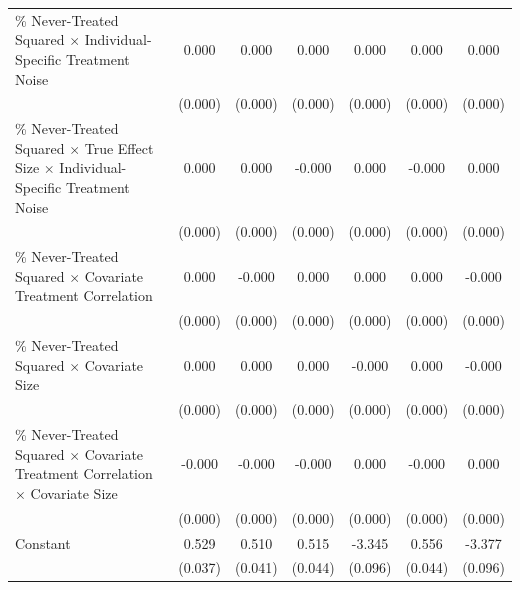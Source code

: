 \documentclass[12pt]{article}
\begin{document}
\begin{table}[htbp]
{\begin{tabular}{p{4.5in}|*{6}{c}}
\% Never-Treated Squared $\times$ Individual-Specific Treatment Noise&       0.000\sym{***}&       0.000\sym{***}&       0.000\sym{***}&       0.000\sym{***}&       0.000\sym{***}&       0.000\sym{***}\\
                    &     (0.000)         &     (0.000)         &     (0.000)         &     (0.000)         &     (0.000)         &     (0.000)         \\
\% Never-Treated Squared $\times$ True Effect Size $\times$ Individual-Specific Treatment Noise&       0.000         &       0.000         &      -0.000         &       0.000         &      -0.000         &       0.000         \\
                    &     (0.000)         &     (0.000)         &     (0.000)         &     (0.000)         &     (0.000)         &     (0.000)         \\
\% Never-Treated Squared $\times$ Covariate Treatment Correlation&       0.000\sym{*}  &      -0.000         &       0.000         &       0.000         &       0.000         &      -0.000         \\
                    &     (0.000)         &     (0.000)         &     (0.000)         &     (0.000)         &     (0.000)         &     (0.000)         \\
\% Never-Treated Squared $\times$ Covariate Size&       0.000         &       0.000         &       0.000         &      -0.000\sym{**} &       0.000         &      -0.000         \\
                    &     (0.000)         &     (0.000)         &     (0.000)         &     (0.000)         &     (0.000)         &     (0.000)         \\
\% Never-Treated Squared $\times$ Covariate Treatment Correlation $\times$ Covariate Size&      -0.000         &      -0.000         &      -0.000         &       0.000         &      -0.000         &       0.000         \\
                    &     (0.000)         &     (0.000)         &     (0.000)         &     (0.000)         &     (0.000)         &     (0.000)         \\
Constant            &       0.529\sym{***}&       0.510\sym{***}&       0.515\sym{***}&      -3.345\sym{***}&       0.556\sym{***}&      -3.377\sym{***}\\
                    &     (0.037)         &     (0.041)         &     (0.044)         &     (0.096)         &     (0.044)         &     (0.096)         \\

\end{tabular}}
\end{table}
\end{document}
